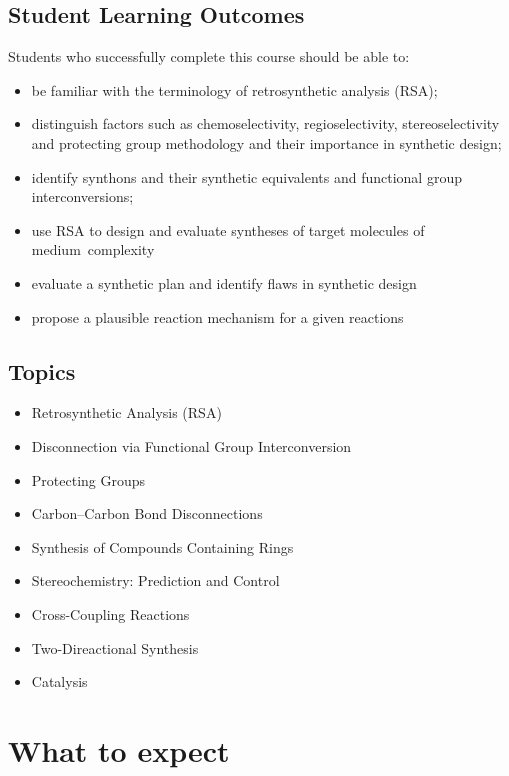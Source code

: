 \hypertarget{slo}{%
\subsection{Student Learning Outcomes}\label{slo}}

Students who successfully complete this course should be able to:

\begin{itemize}
\tightlist
\item
  be familiar with the terminology of retrosynthetic analysis (RSA);
\item
  distinguish factors such as chemoselectivity, regioselectivity,
  stereoselectivity and protecting group methodology and their
  importance in synthetic design;
\item
  identify synthons and their synthetic equivalents and functional group
  interconversions;
\item
  use RSA to design and evaluate syntheses of target molecules of
  medium~complexity
\item
  evaluate a synthetic plan and identify flaws in synthetic design
\item
  propose a plausible reaction mechanism for a given reactions
\end{itemize}

\hypertarget{topics}{%
\subsection{Topics}\label{topics}}

\begin{itemize}
\tightlist
\item
  Retrosynthetic Analysis (RSA)
\item
  Disconnection via Functional Group Interconversion
\item
  Protecting Groups
\item
  Carbon--Carbon Bond Disconnections
\item
  Synthesis of Compounds Containing Rings
\item
  Stereochemistry: Prediction and Control
\item
  Cross-Coupling Reactions
\item
  Two-Direactional Synthesis
\item
  Catalysis
\end{itemize}

\hypertarget{what-to-expect}{%
\section{What to expect}\label{what-to-expect}}

